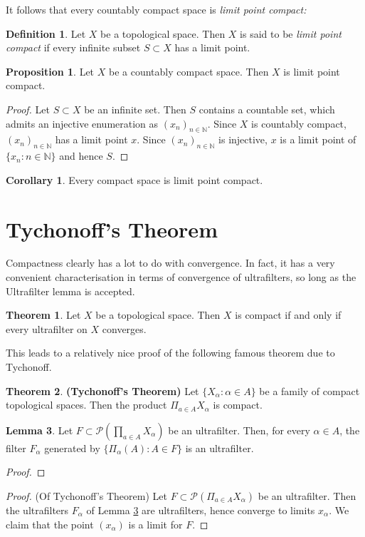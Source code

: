 \documentclass{book}
\theoremstyle{definition}
\newtheorem{theorem}{Theorem}[section]
\newtheorem{proposition}{Proposition}[section]
\newtheorem{corollary}{Corollary}[theorem]
\newtheorem{lemma}[theorem]{Lemma}
\newtheorem{definition}{Definition}[section]
\theoremstyle{remark}
\newcommand{\N}{\mathbb{N}}
\begin{document}
It follows that every countably compact space is \textit{limit point compact:}

\begin{definition}
Let $X$ be a topological space. Then $X$ is said to be \textit{limit point compact} if every infinite subset $S\subset X$ has a limit point.
\end{definition}

\begin{proposition}
Let $X$ be a countably compact space. Then $X$ is limit point compact.
\end{proposition}
\begin{proof}
Let $S\subset X$ be an infinite set. Then $S$ contains a countable set, which admits an injective enumeration as $(x_n)_{n\in\N}$. Since $X$ is countably compact, $(x_n)_{n\in\N}$ has a limit point $x$. Since $(x_n)_{n\in\N}$ is injective, $x$ is a limit point of $\{x_n:n\in\N\}$ and hence $S$.
\end{proof}
\begin{corollary}
Every compact space is limit point compact.
\end{corollary}

\section{Tychonoff's Theorem}
Compactness clearly has a lot to do with convergence. In fact, it has a very convenient characterisation in terms of convergence of ultrafilters, so long as the Ultrafilter lemma is accepted.

\begin{theorem}
Let $X$ be a topological space. Then $X$ is compact if and only if every ultrafilter on $X$ converges.
\end{theorem}

This leads to a relatively nice proof of the following famous theorem due to Tychonoff.

\begin{theorem}
\label{tychonoff}
\textbf{(Tychonoff's Theorem)}\newline
Let $\{X_\alpha:\alpha\in A\}$ be a family of compact topological spaces. Then the product $\Pi_{a\in A} X_\alpha$ is compact.
\end{theorem}
\begin{lemma}
\label{projectultrailfter}
Let $F\subset\mathcal P(\prod_{a\in A} X_\alpha)$ be an ultrafilter. Then, for every $\alpha\in A$, the filter $F_\alpha$ generated by $\{\Pi_\alpha(A):A\in F\}$ is an ultrafilter.
\end{lemma}
\begin{proof}

\end{proof}
\begin{proof} (Of Tychonoff's Theorem)\newline
Let $F\subset\mathcal P(\Pi_{a\in A} X_\alpha)$ be an ultrafilter. Then the ultrafilters $F_\alpha$ of Lemma \ref{projectultrailfter} are ultrafilters, hence converge to limits $x_\alpha$. We claim that the point $(x_\alpha)$ is a limit for $F$.
\end{proof}
\end{document}
